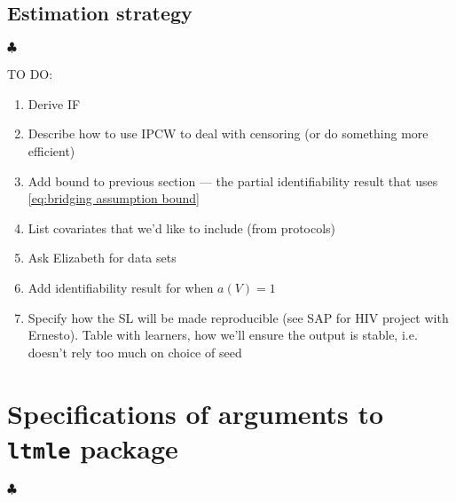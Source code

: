 \documentclass[12pt]{article}
\theoremstyle{definition}
\newcommand\independent{\protect\mathpalette{\protect\independenT}{\perp}}
\def\independenT#1#2{\mathrel{\rlap{$#1#2$}\mkern2mu{#1#2}}}
\DeclareMathOperator{\cE}{\mathbb{E}}
\newcommand{\Hopen}{V}
\begin{document}

\subsection{Estimation strategy}
$\clubsuit$

TO DO:
\begin{enumerate}
    \item Derive IF
    \item Describe how to use IPCW to deal with censoring (or do something more efficient)
    \item Add bound to previous section --- the partial identifiability result that uses \eqref{eq:bridging assumption bound}
    \item List covariates that we'd like to include (from protocols)
    \item Ask Elizabeth for data sets
    \item Add identifiability result for when $a(V)=1$
    \item Specify how the SL will be made reproducible (see SAP for HIV project with Ernesto). Table with learners, how we'll ensure the output is stable, i.e. doesn't rely too much on choice of seed
\end{enumerate}

\newpage
\appendix
\section{Specifications of arguments to \texttt{ltmle} package}
$\clubsuit$
\end{document}
